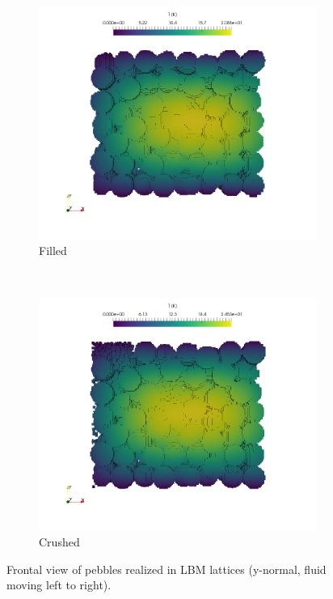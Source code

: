 \begin{figure}[!ht]
    \centering
    \begin{subfigure}[b]{0.44\textwidth}
        \includegraphics[trim={6cm 6cm 5cm 0cm},clip, width = \textwidth]{figures/lbm/lbm-pebbles-z-normal-filled}
        \caption{Filled}\label{fig:lbm-pebble-temperatures-filled-z}
    \end{subfigure}
    ~
    \begin{subfigure}[b]{0.44\textwidth}
        \includegraphics[trim={6cm 6cm 5cm 0cm},clip, width = \textwidth]{figures/lbm/lbm-pebbles-z-normal-crushed}
        \caption{Crushed}\label{fig:lbm-pebble-temperatures-crushed-z}
    \end{subfigure}
    \caption{Frontal view of pebbles realized in LBM lattices (y-normal, fluid moving left to right).}\label{fig:lbm-pebble-temperatures-z}
\end{figure}

